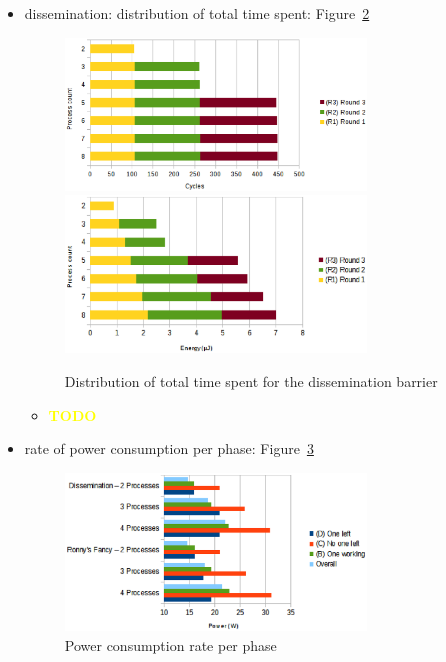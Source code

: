 \documentclass[a4paper, 10pt]{article}
\def \todo{\textbf{\textcolor{yellow}{TODO}}}
\begin{document}
\begin{itemize}
\begin{figure}[htbp]
			\caption{Distribution of total time spent}
			\label{fig:df-work-1000-partition}
		\end{figure}
		\begin{itemize}
			\item \todo
		\end{itemize}
	\item dissemination: distribution of total time spent: Figure~\ref{fig:d-work-1000-partition}
		\begin{figure}[htbp]
			\centering
			\includegraphics[width=8cm]{charts/d-time-work-1000-partition}
			\includegraphics[width=8cm]{charts/d-energy-work-1000-partition}
			\caption{Distribution of total time spent for the dissemination barrier}
			\label{fig:d-work-1000-partition}
		\end{figure}
		\begin{itemize}
			\item \todo
		\end{itemize}
	\item rate of power consumption per phase: Figure~\ref{fig:df-power-work-1000}
		\begin{figure}[htbp]
			\centering
			\includegraphics[width=8cm]{charts/df-power-work-1000}
			\caption{Power consumption rate per phase}
			\label{fig:df-power-work-1000}

\end{figure}
\end{itemize}
\end{document}
